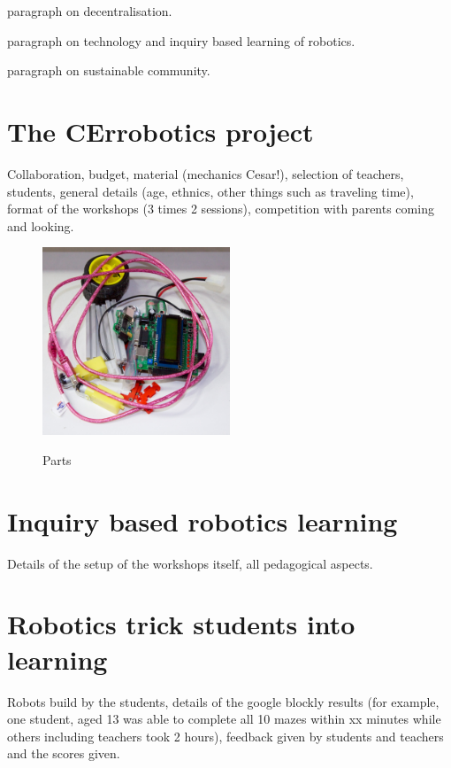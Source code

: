 \documentclass[a4paper]{llncs}
\begin{document}
paragraph on decentralisation.

paragraph on technology and inquiry based learning of robotics.

paragraph on sustainable community.

\section{The CErrobotics project}
Collaboration, budget, material (mechanics Cesar!), selection of teachers, students, general details (age, ethnics, other things such as traveling time), format of the workshops (3 times 2 sessions), competition with parents coming and looking.
\begin{figure}[htp]
\begin{center}
\includegraphics[width=0.5\textwidth]{img/robot_parts.jpg}\label{fig:parts}
\caption[]{Parts}
\end{center}
\end{figure}

\section{Inquiry based robotics learning}
Details of the setup of the workshops itself, all pedagogical aspects.

\section{Robotics trick students into learning}
Robots build by the students, details of the google blockly results (for example, one student, aged 13 was able to complete all 10 mazes within xx minutes while others including teachers took 2 hours), feedback given by students and teachers and the scores given.
\end{document}
